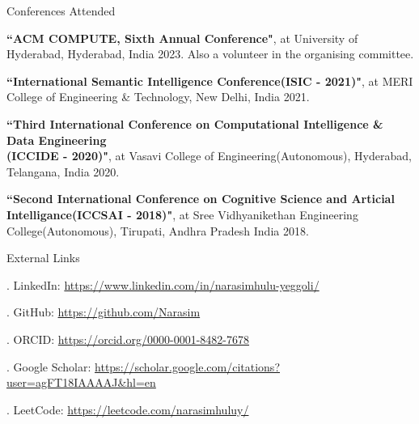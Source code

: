 \documentclass{resume} %
\begin{document}
\begin{rSection}{Conferences Attended}
	
	\begin{rSubsection}{}{}{}{}
		\item \textbf{``ACM COMPUTE, Sixth Annual Conference"}, at University of Hyderabad, Hyderabad, India 2023. Also a volunteer in the organising committee.
		\item \textbf{``International Semantic Intelligence Conference(ISIC - 2021)"}, at MERI College of Engineering \& Technology, New Delhi, India 2021.
		\item \textbf{``Third International Conference on Computational Intelligence \& Data Engineering\\(ICCIDE - 2020)"}, at Vasavi College of Engineering(Autonomous), Hyderabad, Telangana, India 2020.
		\item \textbf{``Second International Conference on Cognitive Science and Articial Intelligance(ICCSAI - 2018)"}, at Sree Vidhyanikethan Engineering College(Autonomous), Tirupati, Andhra Pradesh India 2018.

	\end{rSubsection}

\end{rSection}




\begin{rSection}{External Links}
	
	\begin{rSubsection}{}{}{}{}	
		\item[.] LinkedIn: \hspace{1.5cm} \href{https://www.linkedin.com/in/narasimhulu-yeggoli/}{https://www.linkedin.com/in/narasimhulu-yeggoli/}
		\item[.] GitHub: \hspace{1.8cm} \href{https://github.com/Narasim}{https://github.com/Narasim}
		\item[.] ORCID: \hspace{1.8cm} \href{https://orcid.org/0000-0001-8482-7678}{https://orcid.org/0000-0001-8482-7678}
		\item[.] Google Scholar:  \hspace{0.5cm}
		\href{https://scholar.google.com/citations?user=agFT18IAAAAJ\&hl=en}{https://scholar.google.com/citations?user=agFT18IAAAAJ\&hl=en}
		\item[.] LeetCode: \hspace{1.4cm} \href{https://leetcode.com/narasimhuluy/}{https://leetcode.com/narasimhuluy/}
		
		
	\end{rSubsection}	
	
\end{rSection}
\end{document}

